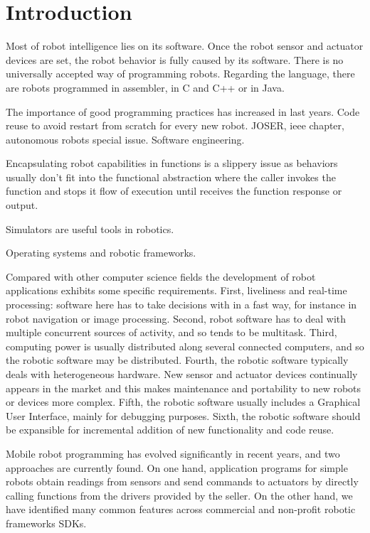 \documentclass[twocolumn]{svjour3}          %
\begin{document}
\section{Introduction}
\label{intro}

Most of robot intelligence lies on its software. Once the robot sensor
and actuator devices are set, the robot behavior is fully caused by
its software. There is no universally accepted way of programming
robots. Regarding the language, there are robots programmed in assembler, in C and C++ or in Java. 

The importance of good programming practices has increased in last years. Code reuse to avoid restart from scratch for every new robot. JOSER, ieee chapter, autonomous robots special issue. Software engineering.

Encapsulating robot capabilities in functions is a slippery issue as behaviors usually don't fit into the functional abstraction where the caller invokes the function and stops it flow of execution until receives the function response or output.

Simulators are useful tools in robotics.

Operating systems and robotic frameworks.

Compared with other computer science fields the development of robot applications exhibits some specific requirements. First, liveliness and real-time processing: software here has to take decisions with in a fast way, for instance in robot navigation or image processing. Second, robot software has to deal with multiple concurrent sources of activity, and so tends to be multitask. Third, computing power is usually distributed along several connected computers, and so the robotic software may be distributed. Fourth, the robotic software typically deals with heterogeneous hardware. New sensor and actuator devices continually appears in the market and this makes maintenance and portability to new robots or devices more complex. Fifth, the robotic software usually includes a Graphical User Interface, mainly for debugging purposes. Sixth, the robotic software should be expansible for incremental addition of new functionality and code reuse.

Mobile robot programming has evolved significantly in recent years, and two approaches are currently found. On one hand, application programs for simple robots obtain readings from sensors and send commands to actuators by directly calling functions from the drivers provided by the seller. On the other hand, we have identified many common features across commercial and non-profit robotic frameworks SDKs.
\end{document}
